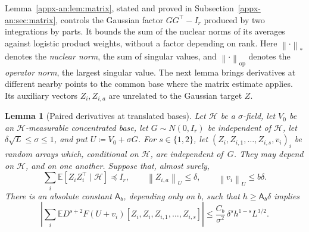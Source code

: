 \documentclass[11pt,letterpaper]{article}
\newtheorem{lemma}{Lemma}
\theoremstyle{remark}
\newcommand{\E}{\mathbb E}
\newcommand{\op}{\mathrm{op}}
\newcommand{\norm}[1]{\left\lVert#1\right\rVert}
\begin{document}
Lemma~\ref{appx-an:lem:matrix}, stated and proved in
Subsection~\ref{appx-an:sec:matrix}, controls the Gaussian factor
\(GG^\top-I_r\) produced by two integrations by parts. It bounds
the sum of the nuclear norms of its averages against logistic product
weights, without a factor depending on rank. Here
\(\norm{\cdot}_*\) denotes the \emph{nuclear norm}, the sum of singular
values, and \(\norm{\cdot}_\op\) denotes the \emph{operator norm},
the largest singular value. The next lemma brings derivatives at
different nearby points to the common base where the matrix estimate
applies. Its auxiliary vectors \(Z_i,Z_{i,a}\) are unrelated to the
Gaussian target \(Z\).

\begin{lemma}[Paired derivatives at translated bases]
\label{appx-an:lem:restoration}
Let \(\mathcal H\) be a \(\sigma\)-field, let \(V_0\) be an
\(\mathcal H\)-measurable concentrated base, let \(G\sim N(0,I_r)\) be
independent of \(\mathcal H\), let \(\delta\sqrt L\le\sigma\le1\), and put
\(U\coloneqq V_0+\sigma G\). For \(s\in\{1,2\}\), let
\((Z_i,Z_{i,1},\ldots,Z_{i,s},v_i)_i\) be random arrays which, conditional
on \(\mathcal H\), are independent of~\(G\). They may depend on
\(\mathcal H\), and on one another. Suppose that, almost surely,
\begin{equation}
 \sum_i\E[Z_iZ_i^\top\mid\mathcal H]\preceq I_r,
 \qquad \norm{Z_{i,a}}_U\le\delta,
 \qquad \norm{v_i}_U\le b\delta.
 \label{appx-an:conditional-budget}
\end{equation}
There is an absolute constant \(\mathsf A_b\), depending only on \(b\),
such that \(h\ge\mathsf A_b\delta\) implies
\begin{equation}
 \left|\sum_i\E D^{s+2}F(U+v_i)
         [Z_i,Z_i,Z_{i,1},\ldots,Z_{i,s}]\right|
 \le\frac{C_b}{\sigma^2}\,
                 \delta^s h^{1-s}L^{3/2}.
 \label{appx-an:restoration-bound}
\end{equation}
\end{lemma}
\end{document}
